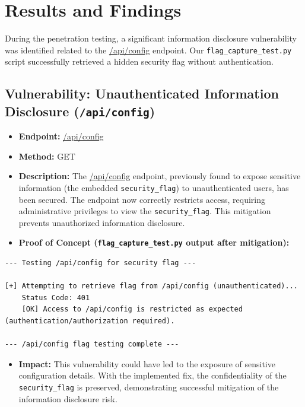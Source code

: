 \documentclass{article}
\begin{document}
\section{Results and Findings}
During the penetration testing, a significant information disclosure vulnerability was identified related to the \url{/api/config} endpoint. Our \texttt{flag\_capture\_test.py} script successfully retrieved a hidden security flag without authentication.

\subsection{\texorpdfstring{\textbf{Vulnerability: Unauthenticated Information Disclosure (\texttt{/api/config})}}{Vulnerability: Unauthenticated Information Disclosure (/api/config)}}
\begin{itemize}
    \item \textbf{Endpoint:} \url{/api/config}
    \item \textbf{Method:} GET
    \item \textbf{Description:}
    The \url{/api/config} endpoint, previously found to expose sensitive information (the embedded \texttt{security\_flag}) to unauthenticated users, has been secured. The endpoint now correctly restricts access, requiring administrative privileges to view the \texttt{security\_flag}. This mitigation prevents unauthorized information disclosure.
    \item \textbf{Proof of Concept (\texttt{flag\_capture\_test.py} output after mitigation):}
\end{itemize}
\begin{lstlisting}[language=text, caption=Output from \texttt{flag\_capture\_test.py} (after mitigation)]
--- Testing /api/config for security flag ---

[+] Attempting to retrieve flag from /api/config (unauthenticated)...
    Status Code: 401
    [OK] Access to /api/config is restricted as expected (authentication/authorization required).

--- /api/config flag testing complete ---
\end{lstlisting}
\begin{itemize}
    \item \textbf{Impact:}
    This vulnerability could have led to the exposure of sensitive configuration details. With the implemented fix, the confidentiality of the \texttt{security\_flag} is preserved, demonstrating successful mitigation of the information disclosure risk.
\end{itemize}
\end{document}
